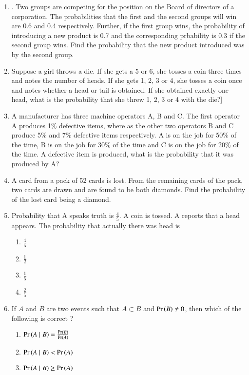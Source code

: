 \begin{enumerate}[label=\thechapter.\arabic*,ref=\thechapter.\theenumi]
\item. Two groups are competing for the position on the Board of directors of a
corporation. The probabilities that the first and the second groups will win are
0.6 and 0.4 respectively. Further, if the first group wins, the probability of
introducing a new product is 0.7 and the corresponding prbability is 0.3 if the
second group wins. Find the probability that the new product introduced was by
the second group.
\\
\solution

\item Suppose a girl throws a die. If she gets a 5 or 6, she tosses a coin three times and
notes the number of heads. If she gets 1, 2, 3 or 4, she tosses a coin once and
notes whether a head or tail is obtained. If she obtained exactly one head, what
is the probability that she threw 1, 2, 3 or 4 with the die?]
\item A manufacturer has three machine operators A, B and C. The first operator A
produces 1\% defective items, where as the other two operators B and C produce 5\% and 7\% defective items respectively. A is on the job for 50\% of the
time, B is on the job for 30\% of the time and C is on the job for 20\% of the time.
A defective item is produced, what is the probability that it was produced by A?
\item A card from a pack of 52 cards is lost. From the remaining cards of the pack,
two cards are drawn and are found to be both diamonds. Find the probability of
the lost card being a diamond.
%
\item Probability that A speaks truth is
$\frac{4}{5}$. A coin is tossed. A reports that a head
appears. The probability that actually there was head is
\begin{enumerate}
\item $\frac{4}{5}$ 
\item $\frac{1}{2}$ 
\item $\frac{1}{5}$ 
\item $\frac{2}{5}$
\end{enumerate}
\solution

\item 
		If $A$ and $B$ are two events such that $A \subset B$ and $\Pr\left(B\right) \neq 0$, then which of the following is correct ?
\begin{enumerate}
\item $\Pr\left(A \mid B\right) = \frac{\Pr\left(B\right)}{\Pr\left(A\right)}$ 
\item $\Pr\left(A \mid B\right) < \Pr\left(A\right)$
\item $\Pr\left(A \mid B\right) \geq \Pr\left(A\right)$  

\end{enumerate}
\end{enumerate}
